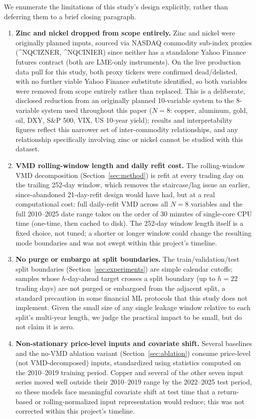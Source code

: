\documentclass[journal]{IEEEtran}
\begin{document}
We enumerate the limitations of this study's design explicitly, rather than deferring them to a brief closing paragraph.

\begin{enumerate}
    \item \textbf{Zinc and nickel dropped from scope entirely.} Zinc and nickel were originally planned inputs, sourced via NASDAQ commodity sub-index proxies (\^{}NQCIZNER, \^{}NQCINIER) since neither has a standalone Yahoo Finance futures contract (both are LME-only instruments). On the live production data pull for this study, both proxy tickers were confirmed dead/delisted, with no further viable Yahoo Finance substitute identified, so both variables were removed from scope entirely rather than replaced. This is a deliberate, disclosed reduction from an originally planned 10-variable system to the 8-variable system used throughout this paper ($N=8$: copper, aluminum, gold, oil, DXY, S\&P 500, VIX, US 10-year yield); results and interpretability figures reflect this narrower set of inter-commodity relationships, and any relationship specifically involving zinc or nickel cannot be studied with this dataset.
    \item \textbf{VMD rolling-window length and daily refit cost.} The rolling-window VMD decomposition (Section~\ref{sec:method}) is refit at every trading day on the trailing 252-day window, which removes the staircase/lag issue an earlier, since-abandoned 21-day-refit design would have had, but at a real computational cost: full daily-refit VMD across all $N=8$ variables and the full 2010--2025 date range takes on the order of 30 minutes of single-core CPU time (one-time, then cached to disk). The 252-day window length itself is a fixed choice, not tuned; a shorter or longer window could change the resulting mode boundaries and was not swept within this project's timeline.
    \item \textbf{No purge or embargo at split boundaries.} The train/validation/test split boundaries (Section~\ref{sec:experiments}) are simple calendar cutoffs; samples whose $h$-day-ahead target crosses a split boundary (up to $h=22$ trading days) are not purged or embargoed from the adjacent split, a standard precaution in some financial ML protocols that this study does not implement. Given the small size of any single leakage window relative to each split's multi-year length, we judge the practical impact to be small, but do not claim it is zero.
    \item \textbf{Non-stationary price-level inputs and covariate shift.} Several baselines and the no-VMD ablation variant (Section~\ref{sec:ablation}) consume price-level (not VMD-decomposed) inputs, standardized using statistics computed on the 2010--2019 training period. Copper and several of the other seven input series moved well outside their 2010--2019 range by the 2022--2025 test period, so these models face meaningful covariate shift at test time that a return-based or rolling-normalized input representation would reduce; this was not corrected within this project's timeline.

\end{enumerate}
\end{document}
